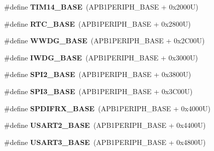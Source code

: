 \begin{DoxyCompactItemize}
\#define {\bfseries T\+I\+M14\+\_\+\+B\+A\+SE}~(A\+P\+B1\+P\+E\+R\+I\+P\+H\+\_\+\+B\+A\+SE + 0x2000\+U)
\item 
\mbox{\label{group___peripheral__memory__map_ga4265e665d56225412e57a61d87417022}} 
\#define {\bfseries R\+T\+C\+\_\+\+B\+A\+SE}~(A\+P\+B1\+P\+E\+R\+I\+P\+H\+\_\+\+B\+A\+SE + 0x2800\+U)
\item 
\mbox{\label{group___peripheral__memory__map_ga9a5bf4728ab93dea5b569f5b972cbe62}} 
\#define {\bfseries W\+W\+D\+G\+\_\+\+B\+A\+SE}~(A\+P\+B1\+P\+E\+R\+I\+P\+H\+\_\+\+B\+A\+SE + 0x2\+C00\+U)
\item 
\mbox{\label{group___peripheral__memory__map_ga8543ee4997296af5536b007cd4748f55}} 
\#define {\bfseries I\+W\+D\+G\+\_\+\+B\+A\+SE}~(A\+P\+B1\+P\+E\+R\+I\+P\+H\+\_\+\+B\+A\+SE + 0x3000\+U)
\item 
\mbox{\label{group___peripheral__memory__map_gac3e357b4c25106ed375fb1affab6bb86}} 
\#define {\bfseries S\+P\+I2\+\_\+\+B\+A\+SE}~(A\+P\+B1\+P\+E\+R\+I\+P\+H\+\_\+\+B\+A\+SE + 0x3800\+U)
\item 
\mbox{\label{group___peripheral__memory__map_gae634fe8faa6922690e90fbec2fc86162}} 
\#define {\bfseries S\+P\+I3\+\_\+\+B\+A\+SE}~(A\+P\+B1\+P\+E\+R\+I\+P\+H\+\_\+\+B\+A\+SE + 0x3\+C00\+U)
\item 
\mbox{\label{group___peripheral__memory__map_gad0c89d1e156c49602ce73483b74c2b6a}} 
\#define {\bfseries S\+P\+D\+I\+F\+R\+X\+\_\+\+B\+A\+SE}~(A\+P\+B1\+P\+E\+R\+I\+P\+H\+\_\+\+B\+A\+SE + 0x4000\+U)
\item 
\mbox{\label{group___peripheral__memory__map_gade83162a04bca0b15b39018a8e8ec090}} 
\#define {\bfseries U\+S\+A\+R\+T2\+\_\+\+B\+A\+SE}~(A\+P\+B1\+P\+E\+R\+I\+P\+H\+\_\+\+B\+A\+SE + 0x4400\+U)
\item 
\mbox{\label{group___peripheral__memory__map_gabe0d6539ac0026d598274ee7f45b0251}} 
\#define {\bfseries U\+S\+A\+R\+T3\+\_\+\+B\+A\+SE}~(A\+P\+B1\+P\+E\+R\+I\+P\+H\+\_\+\+B\+A\+SE + 0x4800\+U)

\end{DoxyCompactItemize}
